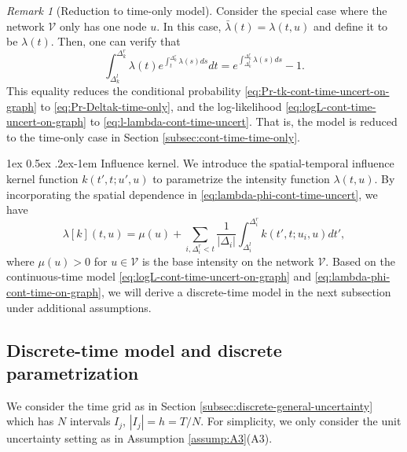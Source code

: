\documentclass[11pt]{article}
\makeatletter
\theoremstyle{remark}
\newtheorem{remark}{Remark}[section]
\theoremstyle{plain}
\newcommand{\calV}{\mathcal{V}}
\renewcommand{\paragraph}{%
  \@startsection{paragraph}{4}%
  {\z@}{1ex \@plus 0.5ex \@minus .2ex}{-1em}%
  {\normalfont\normalsize\itshape}%
}
\makeatother
\begin{document}
\begin{remark}[Reduction to time-only model]
Consider the special case where the network $\calV$ only has one node $u$.
In this case, $\bar{\lambda}(t)= \lambda(t,u)$ and define it to be $\lambda(t)$.
Then, one can verify that
\[
\int_{\Delta_k^l}^{\Delta_k^r} \lambda( t) e^{ \int_t^{\Delta_{k}^r}  {\lambda} (s) ds} dt
= e^{ \int_{\Delta_k^l}^{\Delta_{k}^r}  {\lambda} (s) ds} -1.
\]
This equality reduces the conditional probability \eqref{eq:Pr-tk-cont-time-uncert-on-graph} to \eqref{eq:Pr-Deltak-time-only},
and the log-likelihood \eqref{eq:logL-cont-time-uncert-on-graph} to \eqref{eq:l-lambda-cont-time-uncert}.
That is, the model is reduced to the time-only case in Section \ref{subsec:cont-time-time-only}.
\end{remark}

\paragraph{Influence kernel.}
We introduce the spatial-temporal influence kernel function $k(t', t; u', u)$ to parametrize the intensity function $\lambda(t,u)$.
By incorporating the spatial dependence in \eqref{eq:lambda-phi-cont-time-uncert}, we have
\begin{equation}\label{eq:lambda-phi-cont-time-on-graph}
    \lambda[k](t, u) = \mu(u) + \sum_{i, \Delta_i^r < t } \frac{1}{|\Delta_i|} \int_{\Delta_i^l}^{\Delta_i^r} k( t', t; u_i, u) dt',
\end{equation}
where $\mu(u) > 0$ for $u \in \calV$ is the base intensity on the network $\calV$.
Based on the continuous-time model \eqref{eq:logL-cont-time-uncert-on-graph} and \eqref{eq:lambda-phi-cont-time-on-graph}, we will derive a discrete-time model in the next subsection under additional assumptions.


\subsection{Discrete-time model and discrete parametrization}

We consider the time grid as in Section \ref{subsec:discrete-general-uncertainty} which has $N$ intervals $I_j$, $|I_j| = h=T/N$. 
For simplicity, we only consider the unit uncertainty setting as in Assumption \ref{assump:A3}(A3).
\end{document}
